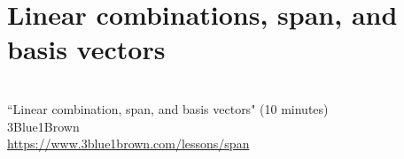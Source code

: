 \section{Linear combinations, span, and basis vectors}
\begin{bookfigure}
   \\
  ``Linear combination, span, and basis vectors" (10 minutes) \\
  \footnotesize 3Blue1Brown \\
  \url{https://www.3blue1brown.com/lessons/span}
\end{bookfigure}
